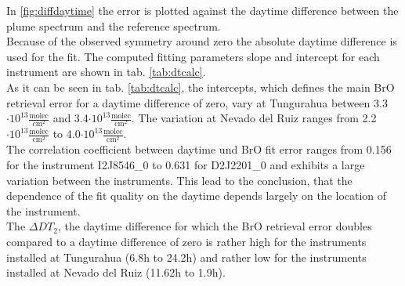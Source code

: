 In \cref{fig:diffdaytime} the  error is plotted against the daytime difference between the plume spectrum and the reference spectrum.  \\
Because of the observed symmetry around zero the absolute daytime difference is used for the fit. The computed fitting parameters slope and intercept for each instrument are shown in tab. \ref{tab:dtcalc}. \\
%
As it can be seen in tab. \ref{tab:dtcalc}, the intercepts, which defines the main BrO retrieval error for a daytime difference of zero, vary at Tungurahua between 3.3$\cdot10^{13}\frac{\text{molec}}{\text{cm}^2}$ and 3.4$\cdot10^{13}\frac{\text{molec}}{\text{cm}^2}$. The variation at Nevado del Ruiz ranges from  2.2$\cdot10^{13}\frac{\text{molec}}{\text{cm}^2}$ to 4.0$\cdot10^{13}\frac{\text{molec}}{\text{cm}^2}$. \\
The correlation coefficient between daytime und BrO fit error 
ranges from 0.156 for the instrument I2J8546\_0  to  0.631 for D2J2201\_0 and exhibits a large variation between the instruments. This lead to the conclusion, that the dependence of the fit quality on the daytime depends largely on the location of the instrument.\\
The $\Delta DT_{2}$, the daytime difference for which the BrO retrieval error doubles compared to a daytime difference of zero is rather high for the instruments installed at Tungurahua (6.8h to 24.2h) and rather low for the instruments installed at Nevado del Ruiz (11.62h to 1.9h).

